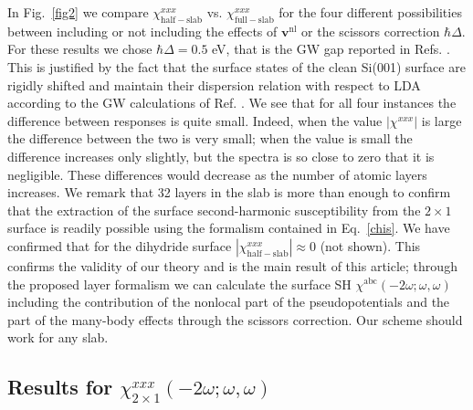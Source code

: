 In Fig.~\ref{fig2} we compare $\chi^{xxx}_{\mathrm{half-slab}}$ vs.
$\chi^{xxx}_{\mathrm{full-slab}}$ for the four different possibilities between
including or not including the effects of $\mathbf{v}^\mathrm{nl}$ or the
scissors correction $\hbar\Delta$. For these results we chose $\hbar\Delta=0.5$
eV, that is the GW gap reported in Refs. \cite{rohlfingPRB95,garciaCPC01}.
This is justified by the fact that the surface states of the clean Si(001)
surface are rigidly shifted and maintain their dispersion relation with respect
to LDA according to the GW calculations of Ref. \cite{rohlfingPRB95}. We
see that for all four instances the difference between responses is quite small.
Indeed, when the value $|\chi^{xxx}|$ is large the difference between the two is
very small; when the value is small the difference increases only slightly, but
the spectra is so close to zero that it is negligible. These differences would
decrease as the number of atomic layers increases. We remark that 32 layers in
the slab is more than enough to confirm that the extraction of the surface
second-harmonic susceptibility from the $2\times 1$ surface is readily possible
using the formalism contained in Eq.~\eqref{chis}. We have confirmed that for
the dihydride surface $|\chi^{xxx}_{\mathrm{half-slab}}|\approx 0$ (not shown).
This confirms the validity of our theory and is the main result of this article;
through the proposed layer formalism we can calculate the surface SH
$\chi^{\mathrm{a}\mathrm{b}\mathrm{c}}(-2\omega;\omega,\omega)$ including the
contribution of the nonlocal part of the pseudopotentials and the part of the
many-body effects through the scissors correction. Our scheme should work for
any slab.

\subsection{\texorpdfstring{Results for $\chi^{xxx}_{2\times 1}(-2\omega;\omega,\omega)$}
{Results for Xxxx(2x1)(-2w;w,w)}}

